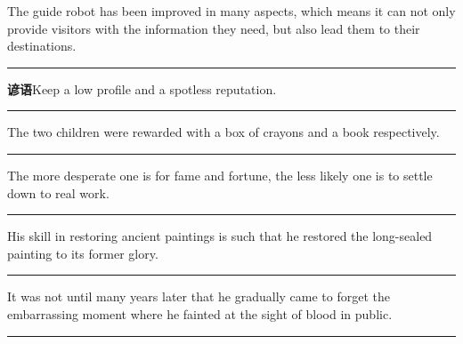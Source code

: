 \documentclass[11pt,a4paper]{article}
\newcommand{\num}[1]{\makebox[1.9em][r]{#1.}\hspace{0.3em}}
\newcommand{\wline}{\noindent\rule{\linewidth}{0.4pt}}
\begin{document}
\begin{minipage}{\linewidth}

\num{4}The guide robot has been improved in many aspects, which means it can not only provide visitors with the information they need, but also lead them to their destinations.

\vspace{0.25em}

\wline

\end{minipage}

\num{5}\textbf{谚语}\quad Keep a low profile and a spotless reputation.

\vspace{0.25em}

\wline

\vspace{0.35em}\vspace{0.15em}

\begin{minipage}{\linewidth}

\num{6}The two children were rewarded with a box of crayons and a book respectively.

\vspace{0.25em}

\wline

\end{minipage}

\begin{minipage}{\linewidth}

\num{7}The more desperate one is for fame and fortune, the less likely one is to settle down to real work.

\vspace{0.25em}

\wline

\end{minipage}

\begin{minipage}{\linewidth}

\num{8}His skill in restoring ancient paintings is such that he restored the long-sealed painting to its former glory.

\vspace{0.25em}

\wline

\end{minipage}

\begin{minipage}{\linewidth}

\num{9}It was not until many years later that he gradually came to forget the embarrassing moment where he fainted at the sight of blood in public.

\vspace{0.25em}

\wline

\end{minipage}
\end{document}
